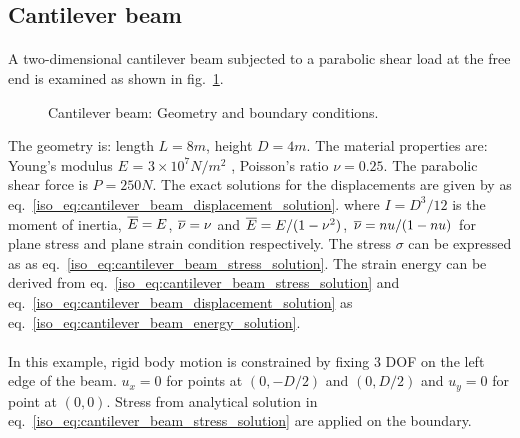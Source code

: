 \subsection{Cantilever beam}
\paragraph{}
A two-dimensional cantilever beam subjected to a parabolic shear load at the free end is examined as shown
in fig.~\ref{qdt_fig:ex_cantilever_beam_geo_bc}.
    \begin{figure}[h!]
    \centering
        \caption{ Cantilever beam: Geometry and boundary conditions.}
        \label{qdt_fig:ex_cantilever_beam_geo_bc}
    \end{figure}

The geometry is: length $L=8m$, height $D=4m$.
The material properties are: Young’s modulus $E$ = $3 \times 10^7 N/m^2$ , Poisson’s ratio $ \nu =0.25$.
The parabolic shear force is $P = 250 N$.
The exact solutions for the displacements are given by \cite{Aug2008} as eq.~\ref{iso_eq:cantilever_beam_displacement_solution}.
where $I=D^3/12$ is the moment of inertia, $\overline{E}=E$, $\overline{\nu}=\nu$ and $\overline{E}=E/(1-\nu^2)$, $\overline{\nu}=nu/(1-nu)$ for plane stress and plane strain condition respectively.
The stress $\sigma$ can be expressed as \cite{Aug2008} as eq.~\ref{iso_eq:cantilever_beam_stress_solution}.
The strain energy can be derived from eq.~\ref{iso_eq:cantilever_beam_stress_solution} and eq.~\ref{iso_eq:cantilever_beam_displacement_solution} as eq.~\ref{iso_eq:cantilever_beam_energy_solution}.

\paragraph{}
In this example, rigid body motion is constrained by fixing 3 DOF on the left edge of the beam.
$u_x=0$ for points at $(0,-D/2)$ and $(0,D/2)$ and $u_y =0$ for point at $(0,0)$.
Stress from analytical solution in eq.~\ref{iso_eq:cantilever_beam_stress_solution} are applied on the boundary.

